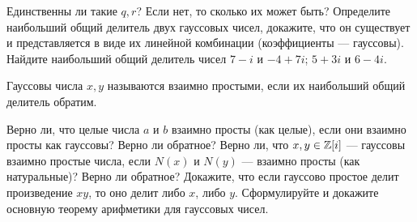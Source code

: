 \documentclass[a4paper,12pt]{article}
\begin{document}
		\vspace{-0.4cm}
  Единственны ли такие $q,r$? Если нет, то сколько их может быть?
	 Определите наибольший общий делитель двух гауссовых чисел, докажите, что он существует и представляется в виде их линейной комбинации (коэффициенты --- гауссовы).
	 Найдите наибольший общий делитель чисел  $7-i$ и $-4+7i$;  $5+3i$ и $6-4i$.
	
	 Гауссовы числа $x,y$ называются взаимно простыми, если их наибольший общий делитель обратим. 
	
	   Верно ли, что целые числа $a$ и $b$ взаимно просты (как целые), если они взаимно просты как гауссовы?  Верно ли обратное?  Верно ли, что $x,y\in \mathbb{Z}[i]$ ---  гауссовы взаимно простые числа, если $N(x)$ и $N(y)$ --- взаимно просты (как натуральные)?  Верно ли обратное?
	 Докажите, что если гауссово простое делит произведение $xy$, то оно делит либо $x$, либо $y$.
	 Сформулируйте и докажите основную теорему арифметики для гауссовых чисел.
	\vspace{-0.2cm}
	
\end{document}
